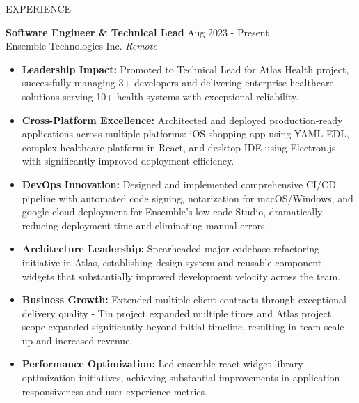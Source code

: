 \documentclass{resume} %
\begin{document}
\begin{rSection}{EXPERIENCE}

\textbf{Software Engineer \& Technical Lead} \hfill Aug 2023 - Present\\
Ensemble Technologies Inc. \hfill \textit{Remote}
 \begin{itemize}
    \itemsep -3pt {} 
     \item \textbf{Leadership Impact:} Promoted to Technical Lead for Atlas Health project, successfully managing 3+ developers and delivering enterprise healthcare solutions serving 10+ health systems with exceptional reliability.
     \item \textbf{Cross-Platform Excellence:} Architected and deployed production-ready applications across multiple platforms: iOS shopping app using YAML EDL, complex healthcare platform in React, and desktop IDE using Electron.js with significantly improved deployment efficiency.
     \item \textbf{DevOps Innovation:} Designed and implemented comprehensive CI/CD pipeline with automated code signing, notarization for macOS/Windows, and google cloud deployment for Ensemble's low-code Studio, dramatically reducing deployment time and eliminating manual errors.
     \item \textbf{Architecture Leadership:} Spearheaded major codebase refactoring initiative in Atlas, establishing design system and reusable component widgets that substantially improved development velocity across the team.
     \item \textbf{Business Growth:} Extended multiple client contracts through exceptional delivery quality - Tin project expanded multiple times and Atlas project scope expanded significantly beyond initial timeline, resulting in team scale-up and increased revenue.
     \item \textbf{Performance Optimization:} Led ensemble-react widget library optimization initiatives, achieving substantial improvements in application responsiveness and user experience metrics.
 \end{itemize}
 

\end{rSection}
\end{document}
